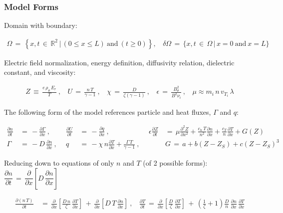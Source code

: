 \documentclass[a4paper,8pt]{article}
\begin{document}
\normalsize

\subsubsection{Model Forms}\label{model-forms}

Domain with boundary: \small

\begin{align}
    \Omega \,=\, \left\{x, t \,\in\, \mathbb{R}^2 \,|\, (0 \leq x \leq L)
        ~\text{and}~ (t \geq 0)\right\}, ~~~~ \delta\Omega \,=\,
        \{x, t \,\in\, \Omega \,|\, x = 0 ~\text{and}~ x = L \}
\end{align}

\normalsize

Electric field normalization, energy definition, diffusivity relation,
dielectric constant, and viscosity: \small

\begin{align}
    Z \,\equiv\, \frac{e \, \rho_\theta \, E_r}{T}~, ~~~~
        U \,=\, \frac{n\,T}{\gamma - 1}~, ~~~~
        \chi \,=\, \frac{D}{\zeta(\gamma - 1)}~, ~~~~
        \epsilon \,=\, \frac{B_\theta^2}{B^2 \nu_i}~, ~~~~
        \mu \approx m_i \, n \, v_{T_i} \, \lambda
\end{align}

\normalsize

The following form of the model references particle and heat fluxes,
\(\Gamma\) and \(q\): \small

\begin{align}
    \frac{\partial n}{\partial t} \,&=\, -\frac{\partial \Gamma}{\partial x}~,~~&
    \frac{\partial U}{\partial t} \,&=\, -\frac{\partial q}{\partial x}~,~~&
    \epsilon \frac{\partial Z}{\partial t} \,&=\,
        \mu \frac{\partial^2 Z}{\partial x^2} + \frac{c_n \, T}{n^2}
        \frac{\partial n}{\partial x} +
        \frac{c_T}{n} \frac{\partial T}{\partial x} + G(Z) \\
    \Gamma \,&=\, -D \, \frac{\partial n}{\partial x}~,~~&
    q \,&=\, -\chi \, n \frac{\partial T}{\partial x} +
        \frac{\Gamma\,T}{\gamma - 1}~,~~&
    &G \,=\, a + b(Z - Z_S) + c(Z - Z_S)^3
\end{align}

\normalsize

Reducing down to equations of only \(n\) and \(T\) (of 2 possible
forms):
\(\dfrac{\partial n}{\partial t} \,=\, \dfrac{\partial}{\partial x}\left[D \, \dfrac{\partial n}{\partial x}\right]\)
\small

\begin{align}
    \frac{\partial(n\,T)}{\partial t} \,&=\,
        \frac{\partial}{\partial x}\left[\frac{D\,n}{\zeta} \,
        \frac{\partial T}{\partial x}\right] \,+\,
        \frac{\partial}{\partial x}\left[D\,T \,
        \frac{\partial n}{\partial x}\right]~, ~~~~
      \frac{\partial T}{\partial t} \,=\, \frac{\partial }{\partial x}
        \left[\frac{D}{\zeta} \, \frac{\partial T}{\partial x}\right] \,+\,
        \left(\frac{1}{\zeta} + 1\right) \frac{D}{n} \,
        \frac{\partial n}{\partial x} \, \frac{\partial T}{\partial x}
\end{align}
\end{document}
